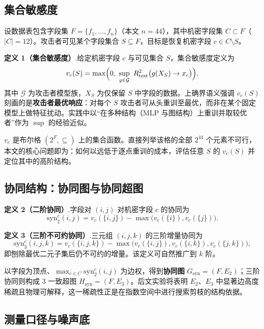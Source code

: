 \documentclass[10.5pt,compsoc,UTF8]{CjC}
\theoremstyle{mystyle}
\begin{document}
\subsection{集合敏感度}

设数据表包含字段集 $F=\{f_1,\dots,f_n\}$（本文 $n=44$），其中机密字段集 $C\subset F$（$|C|=12$）。攻击者可见某个字段集合 $S\subseteq F$，目标是恢复机密字段 $c\in C\setminus S$。

\textbf{定义 1（集合敏感度）}.\quad 给定机密字段 $c$ 与可见集合 $S$，集合敏感度定义为
\begin{equation}
v_c(S)=\max\Bigl(0,\ \sup_{g\in\mathcal{G}}\ R^2_{\mathrm{test}}\bigl(g(X_S)\to x_c\bigr)\Bigr),
\label{eq:vcs}
\end{equation}
其中 $\mathcal{G}$ 为攻击者模型族，$X_S$ 为仅保留 $S$ 中字段的数据。上确界语义强调 $v_c(S)$ 刻画的是\textbf{攻击者最优响应}：对每个 $S$ 攻击者可从头重训至最优，而非在某个固定模型上做特征扰动。实践中以“在多种结构（MLP 与图结构）上重训并取较优者”作为 $\sup$ 的经验近似。

$v_c$ 是布尔格 $(2^F,\subseteq)$ 上的集合函数。直接列举该格的全部 $2^{44}$ 个元素不可行，本文的核心问题即为：如何以远低于逐点重训的成本，评估任意 $S$ 的 $v_c(S)$ 并定位其中的高阶结构。

\subsection{协同结构：协同图与协同超图}

\textbf{定义 2（二阶协同）}.\quad 字段对 $(i,j)$ 对机密字段 $c$ 的协同为
\begin{equation}
\mathrm{syn}_2^c(i,j)=v_c(\{i,j\})-\max\bigl(v_c(\{i\}),v_c(\{j\})\bigr).
\end{equation}

\textbf{定义 3（三阶不可约协同）}.\quad 三元组 $(i,j,k)$ 的三阶增量协同为
\begin{equation}
\mathrm{syn}_3^c(i,j,k)=v_c(\{i,j,k\})-\max\bigl(v_c(\{i,j\}),v_c(\{i,k\}),v_c(\{j,k\})\bigr),
\label{eq:syn3}
\end{equation}
即刨除最优二元子集后仍不可约的增量。该定义可自然推广到 $k$ 阶。

以字段为顶点、$\max_{c\in C}\mathrm{syn}_2^c(i,j)$ 为边权，得到\textbf{协同图} $G_{\mathrm{syn}}=(F,E_2)$；三阶协同则构成 3 一致超图 $H_{\mathrm{syn}}=(F,E_3)$。后文实验将表明 $E_2$、$E_3$ 中显著边高度稀疏且物理可解释，这一稀疏性正是在指数空间中进行搜索剪枝的结构依据。

\subsection{测量口径与噪声底}
\end{document}
